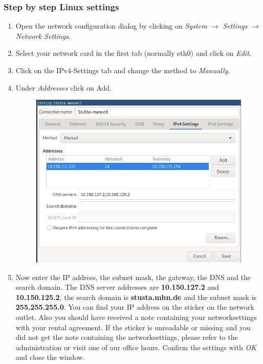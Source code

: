 \documentclass[a4paper,12pt]{scrartcl}
\begin{document}
\subsubsection*{Step by step Linux settings}
\begin{enumerate}
	\item Open the network configuration dialog by clicking on \emph{System} $\rightarrow$ \emph{Settings} $\rightarrow$ \emph{Network Settings}.
	\item Select your network card in the first tab (normally eth0) and click on \emph{Edit}.
	\item Click on the IPv4-Settings tab and change the method to \emph{Manually}.
	\item Under \emph{Addresses} click on Add.
      \begin{figure}[h!]
	\centering
		\begin{minipage}[c]{0.5\linewidth}
			\centering
			\includegraphics[width=0.9\linewidth,keepaspectratio]{Bilder/IP_Ubuntu_neu}
			\vspace{-15pt}
		\end{minipage}
	\end{figure}
  \item Now enter the IP address, the subnet mask, the gateway, the DNS and the search domain. The DNS server addresses are \textbf{10.150.127.2} and \textbf{10.150.125.2}, the search domain is \textbf{stusta.mhn.de} and the subnet mask is \textbf{255.255.255.0}. You can find your IP address on the sticker on the network outlet. Also you should have received a note containing your networksettings with your rental agreement. If the sticker is unreadable or missing and you did not get the note containing the networksettings, please refer to the administration or visit one of our office hours. Confirm the settings with \emph{OK} and close the window.
\end{enumerate}
\end{document}
